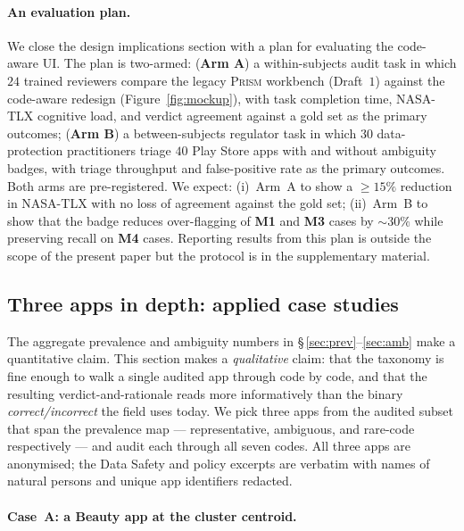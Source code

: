 \documentclass[11pt,a4paper]{article}
\newcommand{\prism}{\textsc{Prism}}
\newcommand{\code}[1]{\textsf{\textbf{#1}}}
\begin{document}
\paragraph{An evaluation plan.}
We close the design implications section with a plan for evaluating
the code-aware UI. The plan is two-armed: (\textbf{Arm A}) a
within-subjects audit task in which $24$ trained reviewers compare
the legacy \prism{} workbench (Draft~$1$) against the code-aware redesign
(Figure~\ref{fig:mockup}), with task completion time, NASA-TLX
\citep{hart2008measurement} cognitive load, and verdict agreement
against a gold set as the primary outcomes; (\textbf{Arm B}) a
between-subjects regulator task in which $30$ data-protection
practitioners triage $40$ Play Store apps with and without
ambiguity badges, with triage throughput and false-positive rate as
the primary outcomes. Both arms are pre-registered. We expect:
(i)~Arm~A to show a $\geq 15\%$ reduction in NASA-TLX with no loss
of agreement against the gold set; (ii)~Arm~B to show that the
badge reduces over-flagging of \code{M1} and \code{M3} cases by
$\sim\!30\%$ while preserving recall on \code{M4} cases. Reporting
results from this plan is outside the scope of the present paper
but the protocol is in the supplementary material.

\subsection{Three apps in depth: applied case studies}\label{sec:cases}

The aggregate prevalence and ambiguity numbers in
\S\,\ref{sec:prev}--\ref{sec:amb} make a quantitative claim. This
section makes a \emph{qualitative} claim: that the taxonomy is fine
enough to walk a single audited app through code by code, and that
the resulting verdict-and-rationale reads more informatively than the
binary \emph{correct/incorrect} the field uses today. We pick three
apps from the audited subset that span the prevalence map ---
representative, ambiguous, and rare-code respectively --- and audit
each through all seven codes. All three apps are anonymised; the
Data Safety and policy excerpts are verbatim with names of natural
persons and unique app identifiers redacted.

\paragraph{Case~A: a Beauty app at the cluster centroid.}
\end{document}
